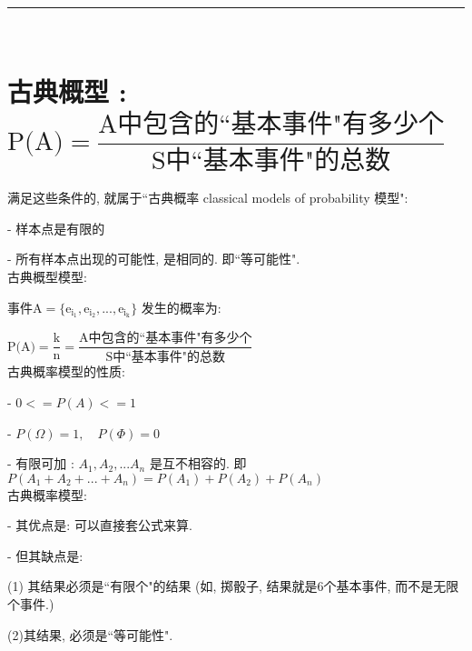 \documentclass[UTF8]{ctexart}
\begin{document}
~\\
\hrule
~\\


\section{古典概型 : $\text{P(A)}=\dfrac{\text{A中包含的``基本事件"有多少个}}{\text{S中``基本事件"的总数}}$}


满足这些条件的, 就属于``古典概率  classical models of probability 模型":

- 样本点是有限的

- 所有样本点出现的可能性, 是相同的. 即``等可能性". \\


古典概型模型:

事件$\text{A}=\{\text{e}_{\text{i}_1},\text{e}_{\text{i}_2},...,\text{e}_{\text{i}_{\text{k}}}\}$ 发生的概率为:

$
\text{P(A)}=\dfrac{\text{k}}{\text{n}}=\dfrac{\text{A中包含的``基本事件"有多少个}}{\text{S中``基本事件"的总数}}
$ \\


古典概率模型的性质:

- $0 <= P(A) <= 1$

- $P(\Omega)=1, \quad  P(\Phi)=0$

- 有限可加 : $ A_1, A_2, ... A_n$ 是互不相容的. 即 $P(A_1 +A_2 + ...+ A_n)= P(A_1) +  P(A_2)  + P(A_n)$ \\

古典概率模型: 

- 其优点是: 可以直接套公式来算. 

- 但其缺点是: 

(1) 其结果必须是``有限个"的结果 (如, 掷骰子, 结果就是6个基本事件, 而不是无限个事件.) 

(2)其结果, 必须是``等可能性".


	
\end{document}
